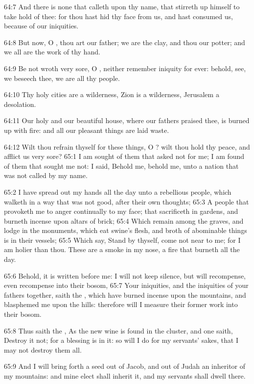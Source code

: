 64:7 And there is none that calleth upon thy name, that stirreth up
himself to take hold of thee: for thou hast hid thy face from us, and
hast consumed us, because of our iniquities.

64:8 But now, O \LORD, thou art our father; we are the clay, and thou
our potter; and we all are the work of thy hand.

64:9 Be not wroth very sore, O \LORD, neither remember iniquity for
ever: behold, see, we beseech thee, we are all thy people.

64:10 Thy holy cities are a wilderness, Zion is a wilderness,
Jerusalem a desolation.

64:11 Our holy and our beautiful house, where our fathers praised
thee, is burned up with fire: and all our pleasant things are laid
waste.

64:12 Wilt thou refrain thyself for these things, O \LORD? wilt thou
hold thy peace, and afflict us very sore?  65:1 I am sought of them
that asked not for me; I am found of them that sought me not: I said,
Behold me, behold me, unto a nation that was not called by my name.

65:2 I have spread out my hands all the day unto a rebellious people,
which walketh in a way that was not good, after their own thoughts;
65:3 A people that provoketh me to anger continually to my face; that
sacrificeth in gardens, and burneth incense upon altars of brick; 65:4
Which remain among the graves, and lodge in the monuments, which eat
swine's flesh, and broth of abominable things is in their vessels;
65:5 Which say, Stand by thyself, come not near to me; for I am holier
than thou. These are a smoke in my nose, a fire that burneth all the
day.

65:6 Behold, it is written before me: I will not keep silence, but
will recompense, even recompense into their bosom, 65:7 Your
iniquities, and the iniquities of your fathers together, saith the
\LORD, which have burned incense upon the mountains, and blasphemed me
upon the hills: therefore will I measure their former work into their
bosom.

65:8 Thus saith the \LORD, As the new wine is found in the cluster, and
one saith, Destroy it not; for a blessing is in it: so will I do for
my servants' sakes, that I may not destroy them all.

65:9 And I will bring forth a seed out of Jacob, and out of Judah an
inheritor of my mountains: and mine elect shall inherit it, and my
servants shall dwell there.


